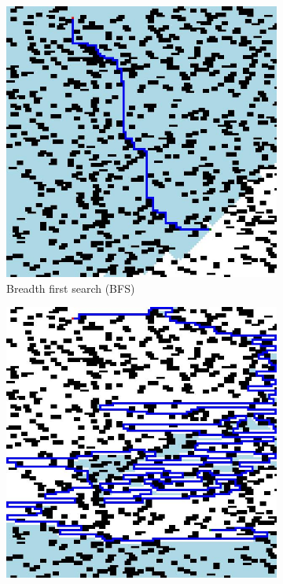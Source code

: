 \documentclass{article}
\begin{document}
\begin{figure}[H]
    \centering
    \begin{subfigure}{0.325\textwidth}
        \centering
        \includegraphics[width = \textwidth]{images/bfs.jpg}
        \caption{Breadth first search (BFS)}
    \end{subfigure}
    \begin{subfigure}{0.325\textwidth}
        \centering
        \includegraphics[width = \textwidth]{images/dfs.jpg}

\end{subfigure}
\end{figure}
\end{document}
